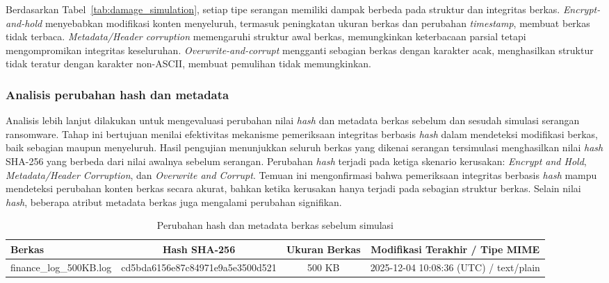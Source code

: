 \documentclass{iaesarticle}
\begin{document}
Berdasarkan Tabel~\ref{tab:damage_simulation}, setiap tipe serangan memiliki dampak berbeda pada struktur dan integritas berkas. \textit{Encrypt-and-hold} menyebabkan modifikasi konten menyeluruh, termasuk peningkatan ukuran berkas dan perubahan \textit{timestamp}, membuat berkas tidak terbaca. \textit{Metadata/Header corruption} memengaruhi struktur awal berkas, memungkinkan keterbacaan parsial tetapi mengompromikan integritas keseluruhan. \textit{Overwrite-and-corrupt} mengganti sebagian berkas dengan karakter acak, menghasilkan struktur tidak teratur dengan karakter non-ASCII, membuat pemulihan tidak memungkinkan.

\subsubsection{Analisis perubahan hash dan metadata}
Analisis lebih lanjut dilakukan untuk mengevaluasi perubahan nilai \textit{hash} dan metadata berkas sebelum dan sesudah simulasi serangan ransomware. Tahap ini bertujuan menilai efektivitas mekanisme pemeriksaan integritas berbasis \textit{hash} dalam mendeteksi modifikasi berkas, baik sebagian maupun menyeluruh. Hasil pengujian menunjukkan seluruh berkas yang dikenai serangan tersimulasi menghasilkan nilai \textit{hash} SHA-256 yang berbeda dari nilai awalnya sebelum serangan. Perubahan \textit{hash} terjadi pada ketiga skenario kerusakan: \textit{Encrypt and Hold}, \textit{Metadata/Header Corruption}, dan \textit{Overwrite and Corrupt}. Temuan ini mengonfirmasi bahwa pemeriksaan integritas berbasis \textit{hash} mampu mendeteksi perubahan konten berkas secara akurat, bahkan ketika kerusakan hanya terjadi pada sebagian struktur berkas. Selain nilai \textit{hash}, beberapa atribut metadata berkas juga mengalami perubahan signifikan.

\begin{table}[H]
\centering
\fontsize{8pt}{10pt}\selectfont
\caption{Perubahan hash dan metadata berkas sebelum simulasi}
\label{tab:hash_before}
\begin{tabularx}{\textwidth}{@{}X c c c@{}}
\hline
\textbf{Berkas} & \textbf{Hash SHA-256} & \textbf{Ukuran Berkas} & \textbf{Modifikasi Terakhir / Tipe MIME} \\
\hline
finance\_log\_500KB.log & cd5bda6156e87c84971e9a5e3500d521 & 500 KB & 2025-12-04 10:08:36 (UTC) / text/plain \\
\hline
\end{tabularx}
\end{table}
\end{document}
